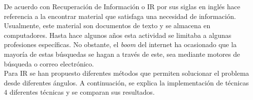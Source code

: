 De acuerdo con \cite{IR-book} Recuperación de Información o IR por sus siglas en inglés hace referencia a la encontrar material que satisfaga una necesidad de información. Usualmente, este material son documentos de texto y se almacena en computadores. Hasta hace algunos años esta actividad se limitaba a algunas profesiones específicas. No obstante, el \textit{boom} del internet ha ocasionado que la mayoría de estas búsquedas se hagan a través de este, sea mediante motores de búsqueda o correo electrónico.\\

Para IR se han propuesto diferentes métodos que permiten solucionar el problema desde diferentes ángulos. A continuación, se explica la implementación de técnicas 4 diferentes técnicas y se comparan sus resultados.